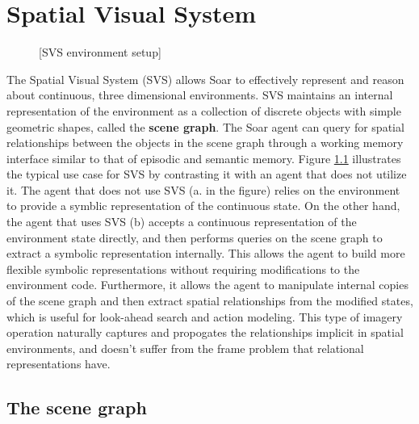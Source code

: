 \chapter{Spatial Visual System}
\label{SVS}

\begin{figure}
	[SVS environment setup]
	\label{fig:svs-setup}
\end{figure}

The Spatial Visual System (SVS) allows Soar to effectively represent and reason about continuous, three dimensional environments.
SVS maintains an internal representation of the environment as a collection of discrete objects with simple geometric shapes, called the \textbf{scene graph}.
The Soar agent can query for spatial relationships between the objects in the scene graph through a working memory interface similar to that of episodic and semantic memory.
Figure \ref{fig:svs-setup} illustrates the typical use case for SVS by contrasting it with an agent that does not utilize it.
The agent that does not use SVS (a. in the figure) relies on the environment to provide a symblic representation of the continuous state.
On the other hand, the agent that uses SVS (b) accepts a continuous representation of the environment state directly, and then performs queries on the scene graph to extract a symbolic representation internally.
This allows the agent to build more flexible symbolic representations without requiring modifications to the environment code.
Furthermore, it allows the agent to manipulate internal copies of the scene graph and then extract spatial relationships from the modified states, which is useful for look-ahead search and action modeling.
This type of imagery operation naturally captures and propogates the relationships implicit in spatial environments, and doesn't suffer from the frame problem that relational representations have.


\section{The scene graph}

